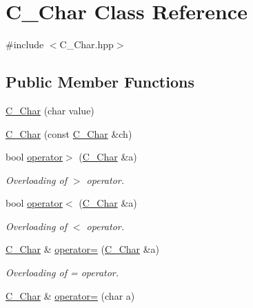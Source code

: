 \hypertarget{class_c___char}{\section{C\+\_\+\+Char Class Reference}
\label{class_c___char}
}


{\ttfamily \#include $<$C\+\_\+\+Char.\+hpp$>$}

\subsection*{Public Member Functions}
\begin{DoxyCompactItemize}
\item 
\hyperlink{class_c___char_a7ea7cadd467d129e66fca2438ffa42a5}{C\+\_\+\+Char} (char value)
\item 
\hyperlink{class_c___char_a4fc4891389cd75d0abccb917dd30cccc}{C\+\_\+\+Char} (const \hyperlink{class_c___char}{C\+\_\+\+Char} \&ch)
\item 
\hypertarget{class_c___char_a50302ddb19383286525db4778819b2be}{bool \hyperlink{class_c___char_a50302ddb19383286525db4778819b2be}{operator$>$} (\hyperlink{class_c___char}{C\+\_\+\+Char} \&a)}\label{class_c___char_a50302ddb19383286525db4778819b2be}

\begin{DoxyCompactList}\small\item\em Overloading of $>$ operator. \end{DoxyCompactList}\item 
\hypertarget{class_c___char_a72a6736313013202274e7eb77dc4d666}{bool \hyperlink{class_c___char_a72a6736313013202274e7eb77dc4d666}{operator$<$} (\hyperlink{class_c___char}{C\+\_\+\+Char} \&a)}\label{class_c___char_a72a6736313013202274e7eb77dc4d666}

\begin{DoxyCompactList}\small\item\em Overloading of $<$ operator. \end{DoxyCompactList}\item 
\hypertarget{class_c___char_afbca0443edb9f6db56500facca8201b5}{\hyperlink{class_c___char}{C\+\_\+\+Char} \& \hyperlink{class_c___char_afbca0443edb9f6db56500facca8201b5}{operator=} (\hyperlink{class_c___char}{C\+\_\+\+Char} \&a)}\label{class_c___char_afbca0443edb9f6db56500facca8201b5}

\begin{DoxyCompactList}\small\item\em Overloading of = operator. \end{DoxyCompactList}\item 
\hypertarget{class_c___char_a13e7406577973f3750b775731786f235}{\hyperlink{class_c___char}{C\+\_\+\+Char} \& \hyperlink{class_c___char_a13e7406577973f3750b775731786f235}{operator=} (char a)}\label{class_c___char_a13e7406577973f3750b775731786f235}


\end{DoxyCompactItemize}
